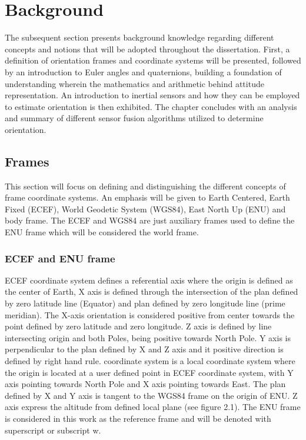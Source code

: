 \section{Background}
The subsequent section presents background knowledge regarding different concepts and notions that will be adopted throughout the dissertation.
First, a definition of orientation frames and coordinate systems will be presented, followed by an introduction to Euler angles and quaternions, building a foundation of understanding wherein the mathematics and arithmetic behind attitude representation. An introduction to inertial sensors and how they can be employed to estimate orientation is then exhibited. The chapter concludes with an analysis and summary of different sensor fusion algorithms utilized to determine orientation.
\subsection{Frames}
This section will focus on defining and distinguishing the different concepts of frame coordinate systems. An emphasis will be given to Earth Centered, Earth Fixed (ECEF), World Geodetic System (WGS84), East North Up (ENU) and body frame. The ECEF and WGS84 are just auxiliary frames used to define the ENU frame which will be considered the world frame.
\subsubsection{ECEF and ENU frame}
ECEF coordinate system defines a referential axis where the origin is defined as the center of Earth,
X axis is defined through the intersection of the plan defined by zero latitude line (Equator) and plan
defined by zero longitude line (prime meridian). The X-axis orientation is considered positive from center
towards the point defined by zero latitude and zero longitude. Z axis is defined by line intersecting origin
and both Poles, being positive towards North Pole. Y axis is perpendicular to the plan defined by X and
Z axis and it positive direction is defined by right hand rule.
coordinate system is a local coordinate system where the origin is located at a user defined
point in ECEF coordinate system, with Y axis pointing towards North Pole and X axis pointing towards
East. The plan defined by X and Y axis is tangent to the WGS84 frame on the origin of ENU. Z axis
express the altitude from defined local plane (see figure 2.1). The ENU frame is considered in this work
as the reference frame and will be denoted with superscript or subscript w.
